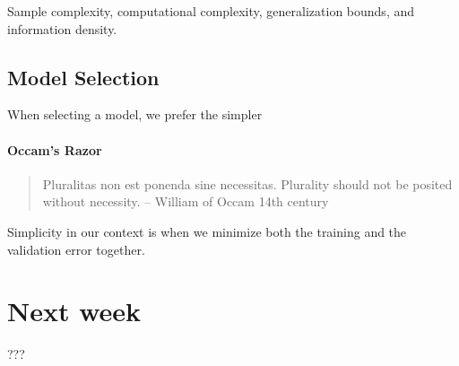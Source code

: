 \documentclass{idc_msc}
\begin{document}
Sample complexity, computational complexity, generalization bounds, and information density.

\subsection{Model Selection}

When selecting a model, we prefer the simpler 

\paragraph{Occam's Razor}

\begin{quote}
Pluralitas non est ponenda sine necessitas.
Plurality should not be posited without necessity.
\hfill -- William of Occam 14th century
\end{quote}

Simplicity in our context is when we minimize both the training and the validation error together.

\section{Next week}

???
\end{document}
